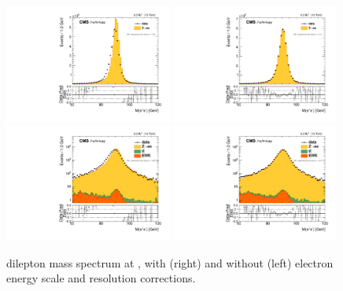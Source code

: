 \begin{figure}[htbp]
\centering
\includegraphics[width=0.49\textwidth]{plots/LepScaleSmear/plotZee5TeV_noCorr/zee_norm.pdf}
\includegraphics[width=0.49\textwidth]{plots/LepScaleSmear/plotZee5TeV_corr/zee_norm.pdf}
\\
\includegraphics[width=0.49\textwidth]{plots/LepScaleSmear/plotZee5TeV_noCorr/zeelog_norm.pdf}
\includegraphics[width=0.49\textwidth]{plots/LepScaleSmear/plotZee5TeV_corr/zeelog_norm.pdf}
\caption{\zee dilepton mass spectrum at \serag, with (right) and without (left) electron energy scale and resolution corrections.}
\label{fig:lepscale:zee:5}
\end{figure}